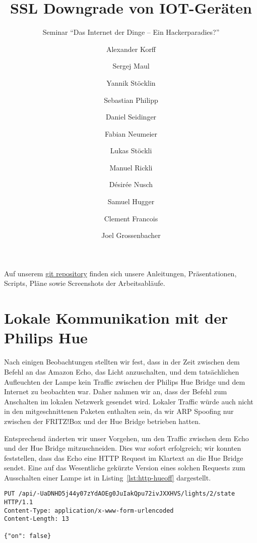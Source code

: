 \documentclass[11pt,a4paper]{scrartcl}
\title{SSL Downgrade von IOT-Geräten}
\subtitle{Seminar ``Das Internet der Dinge -- Ein Hackerparadies?''}
\author{Alexander Korff\and
Sergej Maul\and
Yannik Stöcklin\and
Sebastian Philipp\and
Daniel Seidinger\and
Fabian Neumeier\and
Lukas Stöckli\and
Manuel Rickli\and
Désirée Nusch\and
Samuel Hugger\and
Clement Francois\and
Joel Grossenbacher}
\begin{document}
\maketitle

Auf unserem \href{https://github.com/Xyren0/IoT_Wifi_Sniffing}{git repository} finden sich unsere Anleitungen, Präsentationen, Scripts, Pläne sowie Screenshots der Arbeitsabläufe.

\section{Lokale Kommunikation mit der Philips Hue}
Nach einigen Beobachtungen stellten wir fest, dass in der Zeit zwischen dem Befehl an das
Amazon Echo, das Licht anzuschalten, und dem tatsächlichen Aufleuchten der Lampe kein
Traffic zwischen der Philips Hue Bridge und dem Internet zu beobachten war. Daher nahmen wir
an, dass der Befehl zum Anschalten im lokalen Netzwerk gesendet wird. Lokaler Traffic würde
auch nicht in den mitgeschnittenen Paketen enthalten sein, da wir ARP Spoofing nur zwischen
der FRITZ!Box und der Hue Bridge betrieben hatten.

Entsprechend änderten wir unser Vorgehen,
um den Traffic zwischen dem Echo und der Hue Bridge mitzuschneiden. Dies war sofort
erfolgreich; wir konnten feststellen, dass das Echo eine HTTP Request im Klartext an die Hue
Bridge sendet. Eine auf das Wesentliche gekürzte Version eines solchen Requests zum
Ausschalten einer Lampe ist in Listing~\ref{lst:http-hueoff} dargestellt.
\begin{lstlisting}[label={lst:http-hueoff},caption={Ein HTTP Request zum Ausschalten von Lampe Nr. 2.},float,floatplacement=H]
PUT /api/-UaDNHD5j44y07zYdAOEg0JuIakQpu72ivJXXHVS/lights/2/state HTTP/1.1
Content-Type: application/x-www-form-urlencoded
Content-Length: 13

{"on": false}
\end{lstlisting}
\end{document}
